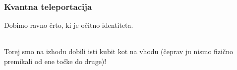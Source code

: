 \documentclass[10pt]{beamer}
\begin{document}
\begin{frame}
  \frametitle{Kvantna teleportacija}
  Dobimo ravno črto, ki je očitno identiteta.\vspace{5mm}\\
  \\
  \vspace{3mm}Torej smo na izhodu dobili isti kubit kot na vhodu (čeprav ju nismo fizično premikali od ene točke do druge)!
\end{frame}
\end{document}
